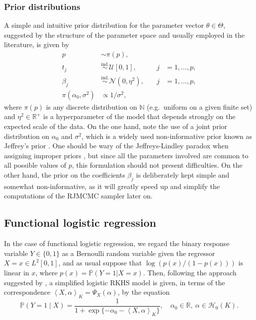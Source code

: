 \documentclass{article}
\numberwithin{equation}{section}
\theoremstyle{plain}
\theoremstyle{definition}
\newcommand{\N}{\mathbb{N}}
\newcommand{\R}{\mathbb{R}}
\newcommand{\Hcal}{\mathcal{H}}
\newcommand\dotprod[2]{\left\langle#1,#2\right\rangle}
\begin{document}
\subsubsection*{Prior distributions}

A simple and intuitive prior distribution for the parameter vector \(\theta \in \Theta\), suggested by the structure of the parameter space and usually employed in the literature, is given by
\begin{equation}\label{eq:prior-linear}
\begin{aligned}
    p & \sim \pi(p),\\
    t_j  & \stackrel{\text{ind.}}{\sim}\mathcal U[0, 1],\quad & j &= 1,\dots,p,\\
    \beta_j  & \stackrel{\text{ind.}}{\sim}\mathcal N(0, \eta^2),\quad & j &= 1,\dots,p,\\
    \pi(\alpha_0, \sigma^2) & \propto 1/\sigma^2,
\end{aligned}
\end{equation}
where  \(\pi(p)\) is any discrete distribution on \(\N\) (e.g.~uniform on a given finite set) and \(\eta^2 \in \R^+\) is a hyperparameter of the model that depends strongly on the expected scale of the data. On the one hand, note the use of a joint prior distribution on \(\alpha_0\) and \(\sigma^2\), which is a widely used non-informative prior known as Jeffrey's prior \citep{jeffreys1946invariant}. One should be wary of the Jeffreys-Lindley paradox when assigning improper priors \citep[see][]{robert2014jeffreys}, but since all the parameters involved are common to all possible values of \(p\), this formulation should not present difficulties. On the other hand, the prior on the coefficients \(\beta_j\) is deliberately kept simple and somewhat non-informative, as it will greatly speed up and simplify the computations of the RJMCMC sampler later on.

\subsection{Functional logistic regression}\label{sec:rkhs-logistic-model}

In the case of functional logistic regression, we regard the binary response variable \(Y\in\{0, 1\}\) as a Bernoulli random variable given the regressor \(X=x \in L^2[0, 1]\), and as usual suppose that \(\log\left(p(x)/(1-p(x))\right)\) is linear in \(x\), where \(p(x)=\mathbb P(Y=1| X=x)\). Then, following the approach suggested by \citet{berrendero2023functional}, a simplified logistic RKHS model is given, in terms of the correspondence \(\dotprod{X}{\alpha}_K = \Psi_X(\alpha)\), by the equation
\begin{equation}\label{eq:rkhs-model-logistic}
  \mathbb P(Y=1 \mid X) = \frac{1}{1 + \exp\{-\alpha_0 - \dotprod{X}{\alpha}_K\}}, \quad \alpha_0 \in \R, \ \alpha \in \Hcal_{0}(K).
\end{equation}
\end{document}
